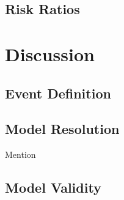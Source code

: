 \subsection{Risk Ratios}\label{subsec:riskratio}



\section{Discussion}\label{sec:discussion}

\begin{comment}
This section should give a picture of what you have taken out of your
project and how you can put it into context.

This section should summarise the results obtained, detail conclusions
reached, suggest future work, and changes that you would make if you
repeated the project.
\end{comment}

\subsection{Event Definition}\label{subsec:diseventdef}



\subsection{Model Resolution}\label{subsec:dismodeldef}

Mention~\cite{Kendon_Fischer_Short_2023}

\subsection{Model Validity}\label{subsec:dismodelvalid}